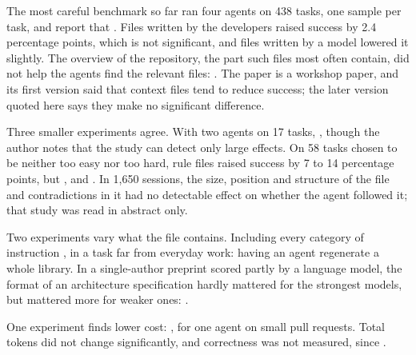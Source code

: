 The most careful benchmark so far ran four agents on 438 tasks, one sample per
task, and \textcite{gloaguen2026agentsmd} report that
.
Files written by the developers raised success by 2.4 percentage points, which
is not significant, and files written by a model lowered it slightly.
The overview of the repository, the part such files most often contain, did not
help the agents find the relevant files:
.
The paper is a workshop paper, and its first version said that context files
tend to reduce success; the later version quoted here says they make no
significant difference.

Three smaller experiments agree.
With two agents on 17 tasks, , though
the author notes that the study can detect only large effects.
On 58 tasks chosen to be neither too easy nor too hard, rule files raised
success by 7 to 14 percentage points, but ,
and .
In 1,650 sessions, the size, position and structure of the file and
contradictions in it had no detectable effect on whether the agent followed
it\autocite{mcmillan2026adherence}; that study was read in abstract only.

Two experiments vary what the file contains.
Including every category of instruction , in a task far from everyday work: having an
agent regenerate a whole library.
In a single-author preprint scored partly by a language model, the format of an
architecture specification hardly mattered for the strongest models, but
mattered more for weaker ones:
.

One experiment finds lower cost:
, for one agent on small pull requests.
Total tokens did not change significantly, and correctness was not measured,
since .

